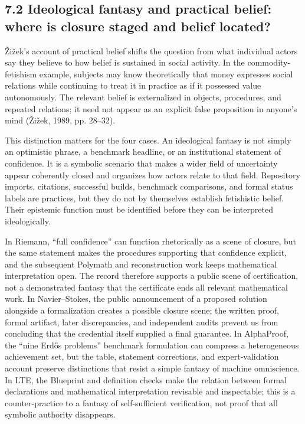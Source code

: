 \documentclass[sn-apa]{sn-jnl}
\begin{document}
\subsection{7.2 Ideological fantasy and practical belief: where is closure staged and belief located?}

Žižek’s account of practical belief shifts the question from what individual actors say they believe to how belief is sustained in social activity. In the commodity-fetishism example, subjects may know theoretically that money expresses social relations while continuing to treat it in practice as if it possessed value autonomously. The relevant belief is externalized in objects, procedures, and repeated relations; it need not appear as an explicit false proposition in anyone’s mind (Žižek, 1989, pp. 28–32).

This distinction matters for the four cases. An ideological fantasy is not simply an optimistic phrase, a benchmark headline, or an institutional statement of confidence. It is a symbolic scenario that makes a wider field of uncertainty appear coherently closed and organizes how actors relate to that field. Repository imports, citations, successful builds, benchmark comparisons, and formal status labels are practices, but they do not by themselves establish fetishistic belief. Their epistemic function must be identified before they can be interpreted ideologically.

In Riemann, “full confidence” can function rhetorically as a scene of closure, but the same statement makes the procedures supporting that confidence explicit, and the subsequent Polymath and reconstruction work keeps mathematical interpretation open. The record therefore supports a public scene of certification, not a demonstrated fantasy that the certificate ends all relevant mathematical work. In Navier–Stokes, the public announcement of a proposed solution alongside a formalization creates a possible closure scene; the written proof, formal artifact, later discrepancies, and independent audits prevent us from concluding that the credential itself supplied a final guarantee. In AlphaProof, the “nine Erdős problems” benchmark formulation can compress a heterogeneous achievement set, but the table, statement corrections, and expert-validation account preserve distinctions that resist a simple fantasy of machine omniscience. In LTE, the Blueprint and definition checks make the relation between formal declarations and mathematical interpretation revisable and inspectable; this is a counter-practice to a fantasy of self-sufficient verification, not proof that all symbolic authority disappears.
\end{document}
